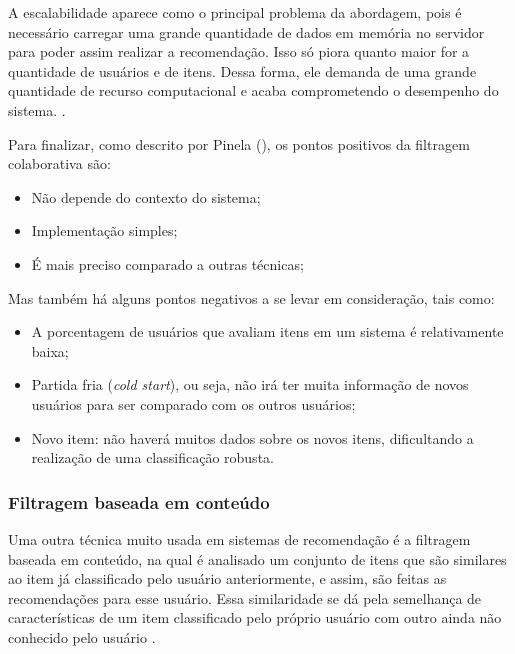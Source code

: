 A escalabilidade aparece como o principal problema da abordagem, pois é necessário carregar uma grande quantidade de dados em memória no servidor para poder assim realizar a recomendação. Isso só piora quanto maior for a quantidade de usuários e de itens. Dessa forma, ele demanda de uma grande quantidade de recurso computacional e acaba comprometendo o desempenho do sistema. \cite{Grover:2017}.

Para finalizar, como descrito por Pinela (\citeyear{Pinela:2017}), os pontos positivos da filtragem colaborativa são:

\begin{itemize}
    \item Não depende do contexto do sistema;
    
    \item Implementação simples;
    
    \item É mais preciso comparado a outras técnicas;
\end{itemize}

Mas também há alguns pontos negativos a se levar em consideração, tais como:

\begin{itemize}
    \item A porcentagem de usuários que avaliam itens em um sistema é relativamente baixa;
    
    \item Partida fria (\textit{cold start}), ou seja, não irá ter muita informação de novos usuários para ser comparado com os outros usuários;
    
    \item Novo item: não haverá muitos dados sobre os novos itens, dificultando a realização de uma classificação robusta.
\end{itemize}

\subsubsection{Filtragem baseada em conteúdo}
\label{Contentbasedfiltering}

Uma outra técnica muito usada em sistemas de recomendação é a filtragem baseada em conteúdo, na qual é analisado um conjunto de itens que são similares ao item já classificado pelo usuário anteriormente, e assim, são feitas as recomendações para esse usuário. Essa similaridade se dá pela semelhança de características de um item classificado pelo próprio usuário com outro ainda não conhecido pelo usuário \cite{Grimaldi:2018}. 

